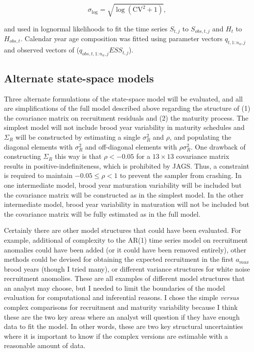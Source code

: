 \documentclass[12pt,]{book}
\theoremstyle{definition}
\theoremstyle{definition}
\theoremstyle{definition}
\theoremstyle{remark}
\begin{document}
\begin{equation}
  \sigma_{\text{log}}=\sqrt{\log(\text{CV}^2+1)},
  \label{eq:cv2sig}
\end{equation}

\noindent
and used in lognormal likelihoods to fit the time series \(S_{t,j}\) to
\(S_{obs,t,j}\) and \(H_t\) to \(H_{obs,t}\). Calendar year age
composition was fitted using parameter vectors \(q_{t,1:n_a,j}\) and
observed vectors of (\(q_{obs,t,1:n_a,j} ESS_{t,j}\)).

\subsection{Alternate state-space models}\label{alt-ssm-models}

\noindent
Three alternate formulations of the state-space model will be evaluated,
and all are simplifications of the full model described above regarding
the structure of (1) the covariance matrix on recruitment residuals and
(2) the maturity process. The simplest model will not include brood year
variability in maturity schedules and \(\Sigma_R\) will be constructed
by estimating a single \(\sigma_R^2\) and \(\rho\), and populating the
diagonal elements with \(\sigma_R^2\) and off-diagonal elements with
\(\rho \sigma_R^2\). One drawback of constructing \(\Sigma_R\) this way
is that \(\rho < -0.05\) for a \(13 \times 13\) covariance matrix
results in positive-indefiniteness, which is prohibited by JAGS. Thus, a
constraint is required to maintain \(-0.05 \le \rho < 1\) to prevent the
sampler from crashing. In one intermediate model, brood year maturation
variability will be included but the covariance matrix will be
constructed as in the simplest model. In the other intermediate model,
brood year variability in maturation will not be included but the
covariance matrix will be fully estimated as in the full model.

Certainly there are other model structures that could have been
evaluated. For example, additional of complexity to the AR(1) time
series model on recruitment anomalies could have been added (or it could
have been removed entirely), other methods could be devised for
obtaining the expected recruitment in the first \(a_{max}\) brood years
(though I tried many), or different variance structures for white noise
recruitment anomolies. These are all examples of different model
structures that an analyst may choose, but I needed to limit the
boundaries of the model evaluation for computational and inferential
reasons. I chose the simple \emph{versus} complex comparisons for
recruitment and maturity variability because I think these are the two
key areas where an analyst will question if they have enough data to fit
the model. In other words, these are two key structural uncertainties
where it is important to know if the complex versions are estimable with
a reasonable amount of data.
\end{document}
